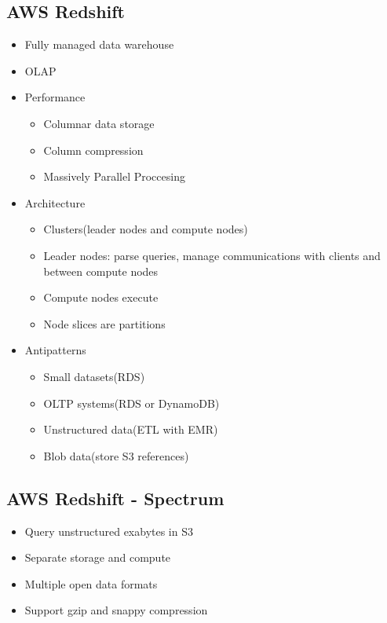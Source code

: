 \documentclass[../../main.tex]{subfiles}
\begin{document}
\subsection{AWS Redshift}
\begin{itemize}
    \item Fully managed data warehouse
    \item OLAP
    \item Performance
    \begin{itemize}
        \item Columnar data storage
        \item Column compression
        \item Massively Parallel Proccesing
    \end{itemize}
    \item Architecture
    \begin{itemize}
        \item Clusters(leader nodes and compute nodes)
        \item Leader nodes: parse queries, manage communications with clients and between compute nodes
        \item Compute nodes execute
        \item Node slices are partitions
    \end{itemize}
    \item Antipatterns
    \begin{itemize}
        \item Small datasets(RDS)
        \item OLTP systems(RDS or DynamoDB)
        \item Unstructured data(ETL with EMR)
        \item Blob data(store S3 references)
    \end{itemize}
\end{itemize}

\subsection{AWS Redshift - Spectrum}
\begin{itemize}
    \item Query unstructured exabytes in S3
    \item Separate storage and compute
    \item Multiple open data formats
    \item Support gzip and snappy compression
\end{itemize}
\end{document}
